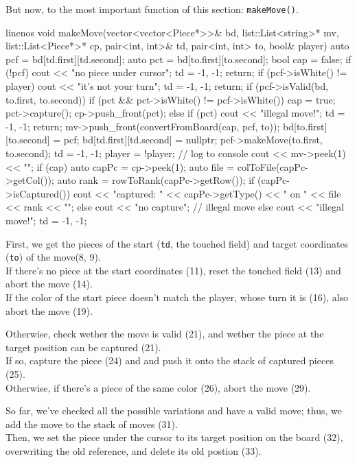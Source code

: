 But now, to the most important function of this section: \texttt{makeMove()}.

\begin{cpp*}{linenos}
void makeMove(vector<vector<Piece*>>& bd,
              list::List<string>* mv,
              list::List<Piece*>* cp,
              pair<int, int>& td,
              pair<int, int> to,
              bool& player)
{
  auto pcf = bd[td.first][td.second];
  auto pct = bd[to.first][to.second];
  bool cap = false;
  if (!pcf) {
    cout << "no piece under cursor\n";
    td = {-1, -1};
    return;
  }
  if (pcf->isWhite() != player) {
    cout << "it's not your turn\n";
    td = {-1, -1};
    return;
  }
  if (pcf->isValid(bd, to.first, to.second)) {
    if (pct && pct->isWhite() != pcf->isWhite()) {
      cap = true;
      pct->capture();
      cp->push_front(pct);
    } else if (pct) {
      cout << "illegal move!\n";
      td = {-1, -1};
      return;
    }
    mv->push_front(convertFromBoard(cap, pcf, to));
    bd[to.first][to.second] = pcf;
    bd[td.first][td.second] = nullptr;
    pcf->makeMove(to.first, to.second);
    td = {-1, -1};
    player = !player;
    // log to console
    cout << mv->peek(1) << "\n";
    if (cap) {
      auto capPc = cp->peek(1);
      auto file = colToFile(capPc->getCol());
      auto rank = rowToRank(capPc->getRow());
      if (capPc->isCaptured())
        cout << "captured: " << capPc->getType() << " on "
             << file << rank << "\n";
    } else {
      cout << "no capture\n";
    }
  // illegal move
  } else {
    cout << "illegal move!\n";
    td = {-1, -1};
  }
}
\end{cpp*}

First, we get the pieces of the start (\texttt{td}, the touched field) and target coordinates (\texttt{to})
of the move(8, 9).\\
If there's no piece at the start coordinates (11), reset the touched field (13) and abort the move (14).\\
If the color of the start piece doesn't match the player, whose turn it is (16), also abort the move (19).

Otherwise, check wether the move is valid (21), and wether the piece at the target position can be
captured (21).\\
If so, capture the piece (24) and and push it onto the stack of captured pieces (25).\\
Otherwise, if there's a piece of the same color (26), abort the move (29).

So far, we've checked all the possible variations and have a valid move; thus, we add the move to the
stack of moves (31).\\
Then, we set the piece under the cursor to its target position on the board (32), overwriting the old
reference, and delete its old postion (33).

